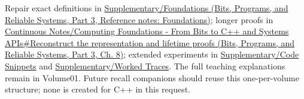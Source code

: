 Repair exact definitions in \href{../01-Bits-Programs-and-Reliable-Systems-P03/main.pdf\#appendix-fd090d982a15}{Supplementary/Foundations (Bits, Programs, and Reliable Systems, Part 3, Reference notes: Foundations)}; longer proofs in \href{../01-Bits-Programs-and-Reliable-Systems-P03/main.pdf\#01-foundations-i-ch010-reconstruct-the-representation-and-lifetime-proofs}{Continuous Notes/Computing Foundations - From Bits to C++ and Systems APIs\#Reconstruct the representation and lifetime proofs (Bits, Programs, and Reliable Systems, Part 3, Ch. 8)}; extended experiments in \hyperref[appendix-4e2236f53445]{Supplementary/Code Snippets} and \hyperref[appendix-92ff77d4dfdc]{Supplementary/Worked Traces}. The full teaching explanations remain in Volume01. Future recall companions should reuse this one-per-volume structure; none is created for C++ in this request.
